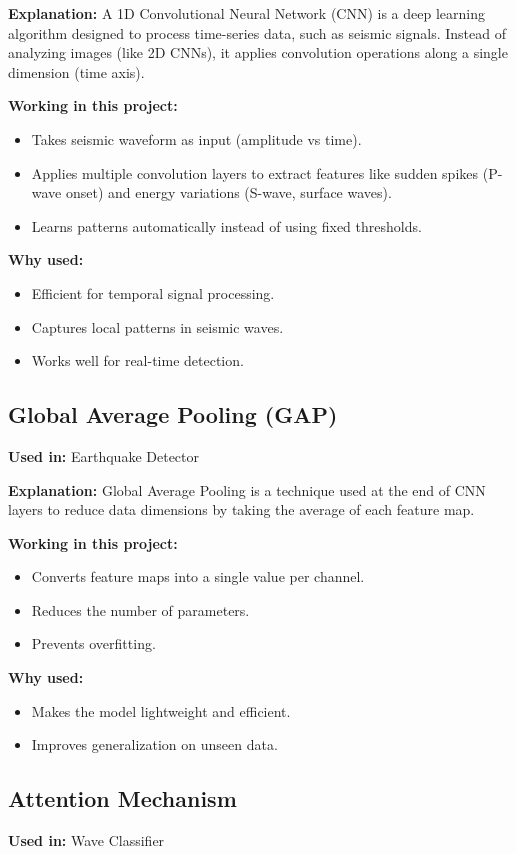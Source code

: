 \documentclass[a4paper,12pt]{report}
\begin{document}
\textbf{Explanation:} A 1D Convolutional Neural Network (CNN) is a deep learning algorithm designed to process time-series data, such as seismic signals. Instead of analyzing images (like 2D CNNs), it applies convolution operations along a single dimension (time axis).

\textbf{Working in this project:}
\begin{itemize}
\item Takes seismic waveform as input (amplitude vs time).
\item Applies multiple convolution layers to extract features like sudden spikes (P-wave onset) and energy variations (S-wave, surface waves).
\item Learns patterns automatically instead of using fixed thresholds.
\end{itemize}

\textbf{Why used:}
\begin{itemize}
\item Efficient for temporal signal processing.
\item Captures local patterns in seismic waves.
\item Works well for real-time detection.
\end{itemize}

\subsection{Global Average Pooling (GAP)}
\textbf{Used in:} Earthquake Detector

\textbf{Explanation:} Global Average Pooling is a technique used at the end of CNN layers to reduce data dimensions by taking the average of each feature map.

\textbf{Working in this project:}
\begin{itemize}
\item Converts feature maps into a single value per channel.
\item Reduces the number of parameters.
\item Prevents overfitting.
\end{itemize}

\textbf{Why used:}
\begin{itemize}
\item Makes the model lightweight and efficient.
\item Improves generalization on unseen data.
\end{itemize}

\subsection{Attention Mechanism}
\textbf{Used in:} Wave Classifier
\end{document}
